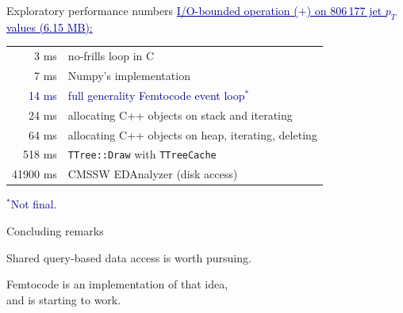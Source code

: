 \documentclass{beamer}
\begin{document}
\begin{frame}{Exploratory performance numbers}
\vspace{0.5 cm}
\textcolor{darkblue}{\underline{I/O-bounded operation ($+$) on 806\,177 jet $p_T$ values (6.15 MB):}}

\vspace{-0.4 cm}
\begin{center}
\renewcommand{\arraystretch}{1.2}
\begin{tabular}{r l}
3 ms & no-frills loop in C \\
7 ms & Numpy's implementation \\
\textcolor{darkblue}{14 ms} & \textcolor{darkblue}{full generality Femtocode event loop$^*$} \\
24 ms & allocating C++ objects on stack and iterating \\
64 ms & allocating C++ objects on heap, iterating, deleting \\
518 ms & {\tt TTree::Draw} with {\tt TTreeCache} \\
41900 ms & CMSSW EDAnalyzer (disk access)
\end{tabular}
\end{center}

\vspace{0.5 cm}
\textcolor{darkblue}{$^*$Not final.}
\end{frame}

\begin{frame}{Concluding remarks}
\begin{center}
\Large
Shared query-based data access is worth pursuing.

\vspace{0.5 cm}
Femtocode is an implementation of that idea, \\ and is starting to work.
\end{center}
\end{frame}
\end{document}
